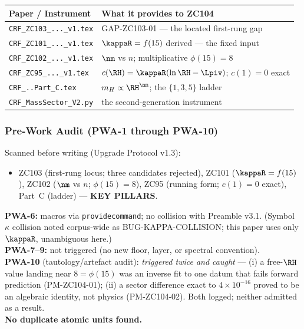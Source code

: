 \documentclass[12pt, a4paper]{article}
\begin{document}
\begin{keybox}[title={Companion Papers --- ZC104}]
{\small\renewcommand{\arraystretch}{1.25}
\begin{center}
\begin{tabular}{@{}p{5.0cm}p{7.5cm}@{}}
\toprule
\textbf{Paper / Instrument} & \textbf{What it provides to ZC104} \\
\midrule
\texttt{CRF\_ZC103\_...\_v1.tex}   & GAP-ZC103-01 --- the located first-rung gap \\
\texttt{CRF\_ZC101\_...\_v1.tex}   & $\kappaR=f(15)$ derived --- the fixed input \\
\texttt{CRF\_ZC102\_...\_v1.tex}   & $\nm$ vs $n$; multiplicative $\phi(15)=8$ \\
\texttt{CRF\_ZC95\_...\_v1.tex}    & $c(\RH)=\kappaR(\ln\RH-\Lpiv)$; $c(1)=0$ exact \\
\texttt{CRF\_..Part\_C.tex}        & $m_H\propto\RH^{\nm}$; the $\{1,3,5\}$ ladder \\
\texttt{CRF\_MassSector\_V2.py}    & the second-generation instrument \\
\bottomrule
\end{tabular}
\end{center}}
\end{keybox}

\subsubsection{Pre-Work Audit (PWA-1 through PWA-10)}

\begin{formalbox}[title={Pre-Work Audit Record --- ZC104}]
Scanned before writing (Upgrade Protocol v1.3):
\begin{itemize}[leftmargin=2em, noitemsep]
  \item ZC103 (first-rung locus; three candidates rejected), ZC101
    ($\kappaR=f(15)$), ZC102 ($\nm$ vs $n$; $\phi(15)=8$), ZC95 (running form;
    $c(1)=0$ exact), Part~C (ladder) --- \textbf{KEY PILLARS}.
\end{itemize}
\textbf{PWA-6:} macros via \texttt{providecommand}; no collision with Preamble
v3.1. (Symbol $\kappa$ collision noted corpus-wide as BUG-KAPPA-COLLISION;
this paper uses only $\kappaR$, unambiguous here.)\\
\textbf{PWA-7--9:} not triggered (no new floor, layer, or spectral convention).\\
\textbf{PWA-10} (tautology/artefact audit): \emph{triggered twice and caught} ---
(i) a free-$\RH$ value landing near $8=\phi(15)$ was an inverse fit to one datum
that fails forward prediction (PM-ZC104-01); (ii) a sector difference exact to
$4\times10^{-16}$ proved to be an algebraic identity, not physics (PM-ZC104-02).
Both logged; neither admitted as a result.\\
\textbf{No duplicate atomic units found.}
\end{formalbox}
\end{document}
